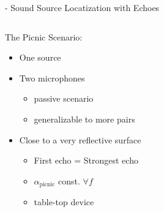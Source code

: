 \begin{frame}[t]{\mirage - Sound Source Locatization with Echoes}

    \vspace*{5mm}
    \begin{columns}

        \begin{column}{0.5\textwidth}
            \begin{block}{The \alert{Picnic} Scenario:}
                \begin{itemize}
                    \small
                    \item<1-> One source
                    \item<1-> Two microphones
                    \begin{itemize}
                        \item<1->[$\rightarrow$] passive scenario
                        \item<1->[$\rightarrow$] generalizable to more pairs
                    \end{itemize}
                    \item<2-> Close to a very reflective surface
                    \begin{itemize}
                        \item<2->[$\rightarrow$] First echo = Strongest echo
                        \item<2->[$\rightarrow$] $\alpha_\text{picnic}$ const. $\forall f$
                        \item<2->[$\rightarrow$] table-top device
                    \end{itemize}
                \end{itemize}
            \end{block}
        \end{column}

        \begin{column}{0.5\textwidth}
            \centering
        \end{column}
    \end{columns}

    \pause[3]
    \vfill
    \begin{columns}[T,onlytextwidth]


\end{columns}
\end{frame}
